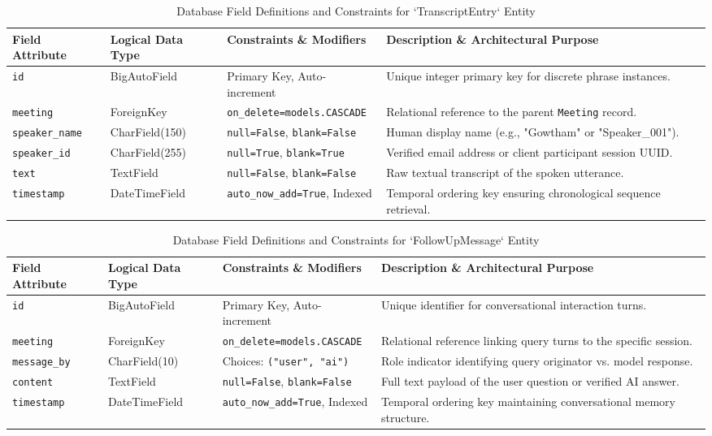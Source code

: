 \documentclass[12pt,oneside,letterpaper]{report}
\numberwithin{equation}{chapter} %
\begin{document}
\begin{table}[H]
\centering
\caption{Database Field Definitions and Constraints for `TranscriptEntry` Entity}
\label{tab:model_transcript}
\footnotesize
\begin{tabularx}{\textwidth}{p{3.2cm}p{2.5cm}p{3.2cm}X}
\toprule
\textbf{Field Attribute} & \textbf{Logical Data Type} & \textbf{Constraints \& Modifiers} & \textbf{Description \& Architectural Purpose} \\
\midrule
\texttt{id} & BigAutoField & Primary Key, Auto-increment & Unique integer primary key for discrete phrase instances. \\
\texttt{meeting} & ForeignKey & \texttt{on\_delete=models.CASCADE} & Relational reference to the parent \texttt{Meeting} record. \\
\texttt{speaker\_name} & CharField(150) & \texttt{null=False}, \texttt{blank=False} & Human display name (e.g., "Gowtham" or "Speaker\_001"). \\
\texttt{speaker\_id} & CharField(255) & \texttt{null=True}, \texttt{blank=True} & Verified email address or client participant session UUID. \\
\texttt{text} & TextField & \texttt{null=False}, \texttt{blank=False} & Raw textual transcript of the spoken utterance. \\
\texttt{timestamp} & DateTimeField & \texttt{auto\_now\_add=True}, Indexed & Temporal ordering key ensuring chronological sequence retrieval. \\
\bottomrule
\end{tabularx}
\end{table}

\begin{table}[H]
\centering
\caption{Database Field Definitions and Constraints for `FollowUpMessage` Entity}
\label{tab:model_followup}
\footnotesize
\begin{tabularx}{\textwidth}{p{3.2cm}p{2.5cm}p{3.2cm}X}
\toprule
\textbf{Field Attribute} & \textbf{Logical Data Type} & \textbf{Constraints \& Modifiers} & \textbf{Description \& Architectural Purpose} \\
\midrule
\texttt{id} & BigAutoField & Primary Key, Auto-increment & Unique identifier for conversational interaction turns. \\
\texttt{meeting} & ForeignKey & \texttt{on\_delete=models.CASCADE} & Relational reference linking query turns to the specific session. \\
\texttt{message\_by} & CharField(10) & Choices: \texttt{("user", "ai")} & Role indicator identifying query originator vs. model response. \\
\texttt{content} & TextField & \texttt{null=False}, \texttt{blank=False} & Full text payload of the user question or verified AI answer. \\
\texttt{timestamp} & DateTimeField & \texttt{auto\_now\_add=True}, Indexed & Temporal ordering key maintaining conversational memory structure. \\
\bottomrule
\end{tabularx}
\end{table}
\end{document}
